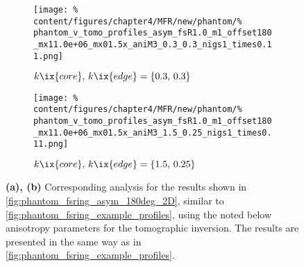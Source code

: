                 \begin{figure}[t]%
                    \centering%
                    \begin{subfigure}{\textwidth}%
                        \centering%
                        \texttt{[image: \%
                            content/figures/chapter4/MFR/new/phantom/\%
                            phantom\_v\_tomo\_profiles\_asym\_fsR1.0\_m1\_offset180\_mx11.0e+06\_mx01.5x\_aniM3\_0.3\_0.3\_nigs1\_times0.11.png]}%
                        \caption{$k\ix{core},\,k\ix{edge}=\left\{0.3,\,0.3\right\}$}%
                    \end{subfigure}%
                    \newline%
                    \begin{subfigure}{\textwidth}%
                        \centering%
                        \texttt{[image: \%
                            content/figures/chapter4/MFR/new/phantom/\%
                            phantom\_v\_tomo\_profiles\_asym\_fsR1.0\_m1\_offset180\_mx11.0e+06\_mx01.5x\_aniM3\_1.5\_0.25\_nigs1\_times0.11.png]}%
                        \caption{$k\ix{core},\,k\ix{edge}=\left\{1.5,\,0.25\right\}$}%
                    \end{subfigure}%
                    \caption{\textbf{(a), (b)} Corresponding analysis for the results shown in \cref{fig:phantom_fsring_asym_180deg_2D}, similar to \cref{fig:phantom_fsring_example_profiles}, using the noted below anisotropy parameters for the tomographic inversion. The results are presented in the same way as in \cref{fig:phantom_fsring_example_profiles}.}\label{fig:phantom_fsring_asym_180deg_profiles}%
                \end{figure}%

